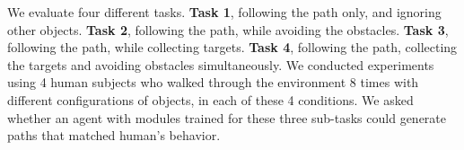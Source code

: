 We evaluate four different tasks. {\bf Task 1}, following the path only, and
ignoring other objects. {\bf Task 2}, following the path, while avoiding the
obstacles.  {\bf Task 3}, following the path, while collecting targets. {\bf
Task 4}, following the path, collecting the targets and avoiding obstacles
simultaneously.  We conducted experiments using 4 human subjects who walked
through the environment 8 times with different configurations of objects, in
each of these 4 conditions.  We asked whether an agent with modules trained for
these three sub-tasks could generate paths that matched human's behavior.


